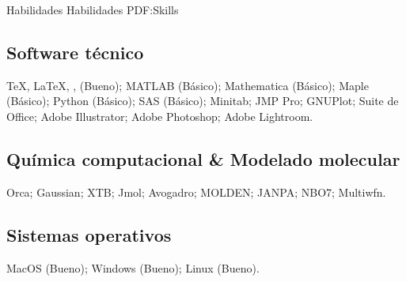 
\Section
{Habilidades}
{Habilidades}
{PDF:Skills}

\Entry
\subsection*{Software técnico}
{\TeX}, {\LaTeX}, {\XeLaTeX}, (Bueno);
MATLAB (Básico);
Mathematica (Básico);
Maple (Básico);
Python (Básico);
SAS (Básico);
Minitab;
JMP Pro;
GNUPlot;
Suite de Office;
Adobe Illustrator;
Adobe Photoshop;
Adobe Lightroom.

\Entry
\subsection*{Química computacional \& Modelado molecular}
\begin{itemize}
Orca;
Gaussian;
XTB;
Jmol;
Avogadro;
MOLDEN;
JANPA;
NBO7;
Multiwfn.
\end{itemize}

\subsection*{Sistemas operativos}
MacOS (Bueno);
Windows (Bueno);
Linux (Bueno).
